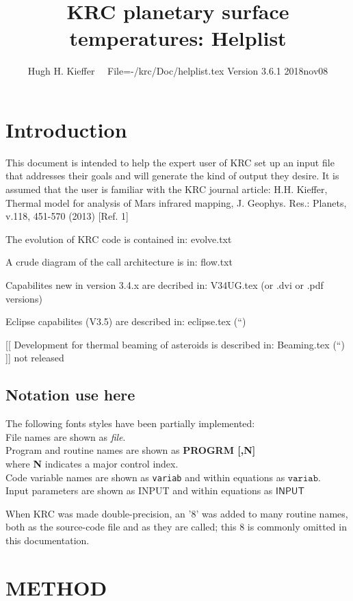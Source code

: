 \documentclass{article}
\title{KRC planetary surface temperatures: Helplist}
\author{Hugh H. Kieffer  \ \ File=-/krc/Doc/helplist.tex Version 3.6.1 2018nov08}
\newcommand{\qi}{\\ \hspace*{2.em}}      %
\newcommand{\qii}{\\ \hspace*{4.em}}     %
\newcommand{\np}{\textbf}  %
\newcommand{\nf}{\textit}  %
\newcommand{\nv}{\texttt}  %
\newcommand{\nvf}{\mathtt} %
\newcommand{\nj}{\textsf}  %
\newcommand{\njf}{\mathsf} %
\begin{document}
\maketitle

\tableofcontents
 \listoftables



\section{Introduction} %

This document is intended to help the expert user of KRC set up an input file
that addresses their goals and will generate the kind of output they desire. It
is assumed that the user is familiar with the KRC journal article: H.H. Kieffer,
Thermal model for analysis of Mars infrared mapping, J. Geophys. Res.: Planets,
v.118, 451-570 (2013) [Ref. 1]

The evolution of KRC code is contained in:  evolve.txt 

A crude diagram of the call architecture is in:  flow.txt

Capabilites new in version 3.4.x are decribed in: V34UG.tex (or .dvi or .pdf versions)

Eclipse capabilites (V3.5) are described in: eclipse.tex  (``)

[[ Development for thermal beaming of asteroids is described in: Beaming.tex (``) ]] not released

\subsection{Notation use here}
The following fonts styles have been partially implemented: 
\qi File names are shown as \nf{file}. 
\qi Program and routine names are shown as \np{PROGRM [,N]} 
\qii where \np{N} indicates a major control index. 
\qi Code variable names are shown as \nv{variab} and within equations as $\nvf{variab}$.  
\qi Input parameters are shown as \nj{INPUT} and within equations as $\njf{INPUT}$

When KRC was made double-precision, an '8' was added to many routine names, both
as the source-code file and as they are called; this 8 is commonly omitted in
this documentation.

\section{METHOD}
\end{document}
